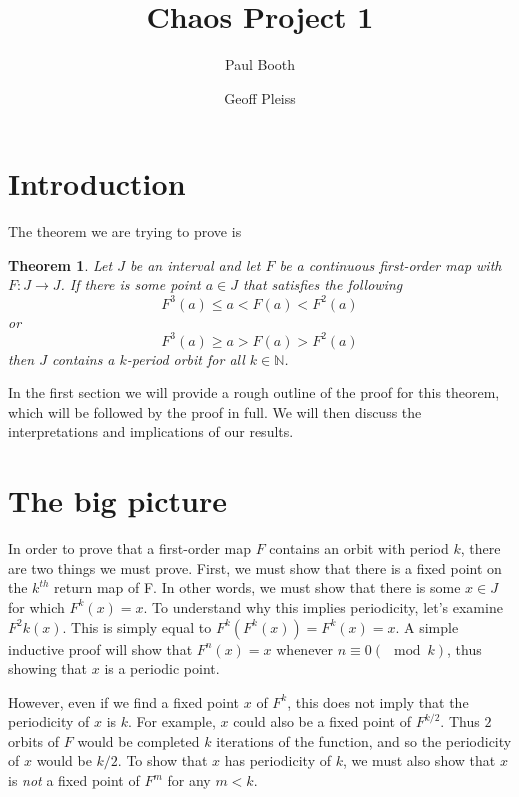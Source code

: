 \documentclass[12pt]{IEEEtran}
\title{Chaos Project 1}
\author{
  Paul Booth \\
  \and
  Geoff Pleiss
}
\date{}
\newtheorem{thm}{Theorem}
\begin{document}
  \maketitle

\begin{abstract}
\end{abstract}



\section{Introduction}

The theorem we are trying to prove is

\begin{thm}
\label{thm:mainthm}
	Let $J$ be an interval and let $F$ be a continuous first-order map with $F : J \rightarrow J$. If there is some point $a \in J$ that satisfies the following
	\[ F^3\left(a\right) \leq a < F\left(a\right) < F^2\left(a\right) \]
	or
	\[ F^3\left(a\right) \geq a > F\left(a\right) > F^2\left(a\right) \]
	then $J$ contains a $k$-period orbit for all $k \in \mathbb{N}$.
\end{thm}

In the first section we will provide a rough outline of the proof for this theorem, which will be followed by the proof in full. We will then discuss the interpretations and implications of our results.



\section{The big picture}

In order to prove that a first-order map $F$ contains an orbit with period $k$, there are two things we must prove. First, we must show that there is a fixed point on the $k^{th}$ return map of F. In other words, we must show that there is some $x \in J$ for which $F^k \left( x \right) = x$. To understand why this implies periodicity, let's examine $F^2k \left( x \right)$. This is simply equal to $F^k \left( F^k \left( x \right) \right) = F^k \left( x \right) = x$. A simple inductive proof will show that $F^n \left( x \right) = x$ whenever $n \equiv 0 \left(\mod k \right)$, thus showing that $x$ is a periodic point.

However, even if we find a fixed point $x$ of $F^k$, this does not imply that the periodicity of $x$ is $k$. For example, $x$ could also be a fixed point of $F^{k/2}$. Thus $2$ orbits of $F$ would be completed $k$ iterations of the function, and so the periodicity of $x$ would be $k/2$. To show that $x$ has periodicity of $k$, we must also show that $x$ is {\it not} a fixed point of $F^m$ for any $m < k$.
\end{document}
